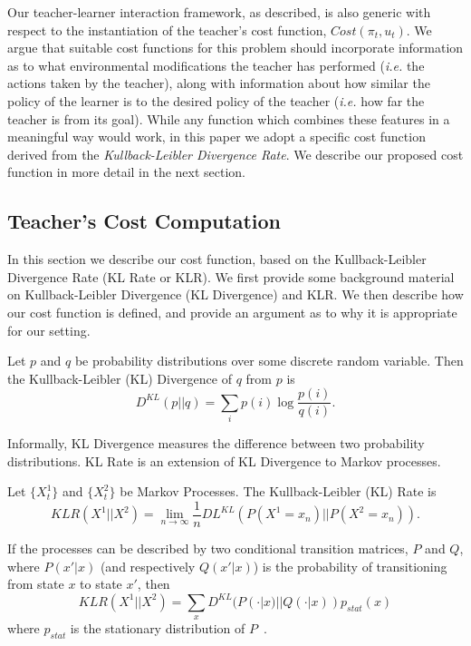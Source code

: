 Our teacher-learner interaction framework, as described, is also
generic with respect to the instantiation of the teacher's cost
function, $Cost(\pi_t,u_t)$. We argue that suitable cost functions for
this problem should incorporate information as to what environmental
modifications the teacher has performed (\emph{i.e.} the actions taken
by the teacher), along with information about how similar the policy
of the learner is to the desired policy of the teacher (\emph{i.e.}
how far the teacher is from its goal). While any function which
combines these features in a meaningful way would work, in this paper
we adopt a specific cost function derived from the
\emph{Kullback-Leibler Divergence Rate}.  We describe our proposed
cost function in more detail in the next section.



\subsection{Teacher's Cost Computation}\label{sec:KLCost}

In this section we describe our cost function, based on the
Kullback-Leibler Divergence Rate (KL Rate or KLR).  We first provide some
background material on Kullback-Leibler Divergence (KL Divergence) and
KLR. We then describe how our cost function is defined, and provide an
argument as to why it is appropriate for our setting.


\begin{Definition}
Let $p$ and $q$ be probability distributions over some discrete random
variable. Then the Kullback-Leibler (KL) Divergence of $q$ from $p$ is
\[
D^{KL}(p||q)=\sum_i p(i)\log \frac{p(i)}{q(i)}.
\]
\end{Definition}

\noindent Informally, KL Divergence measures the difference between
two probability distributions.  KL Rate is an extension of KL
Divergence to Markov processes.
\begin{Definition}
Let $\{X^1_t\}$ and $\{X^2_t\}$ be Markov Processes.  The
Kullback-Leibler (KL) Rate is
\[
KLR(X^1||X^2)=\lim_{n\rightarrow \infty} \frac{1}{n}DL^{KL}(P(X^1=x_n)||P(X^2=x_n)).
\]
\end{Definition}
If the processes can be described by two conditional transition
matrices, $P$ and $Q$, where $P(x'|x)$ (and respectively $Q(x'|x)$) is
the probability of transitioning from state $x$ to state $x'$, then
\[
KLR(X^1||X^2)=\sum_{x} D^{KL}(P(\cdot|x)||Q(\cdot|x))p_{stat}(x)
\]
where $p_{stat}$ is the stationary distribution of
$P$~\cite{rached_alajaji_campbell_2004}.


